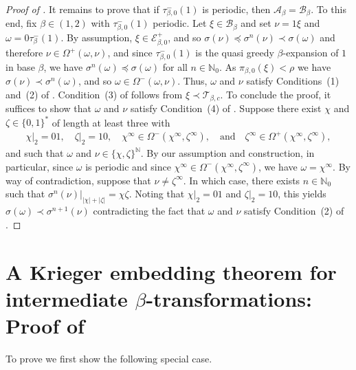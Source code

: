 \documentclass[a4paper,reqno,10pt]{amsart}
\begin{document}
\begin{proof}[Proof of \texorpdfstring{}{Theorem 1.1}]
It remains to prove that if $\tau_{\beta,0}^-(1)$ is periodic, then $\mathcal{A}_\beta = \mathcal{B}_\beta$. To this end, fix $\beta \in (1, 2)$ with $\tau_{\beta,0}^{-}(1)$ periodic. Let $\xi \in \mathcal{B}_\beta $ and set $\nu=1 \xi$ and $\omega = 0\tau_\beta^-(1)$. By assumption, $\xi \in \mathcal{E}_{\beta,0}^+$, and so $\sigma(\nu) \preceq \sigma^{n}(\nu) \prec \sigma(\omega)$ and therefore $\nu \in \Omega^{+}(\omega, \nu)$, and since $\tau_{\beta,0}^{-}(1)$ is the quasi greedy $\beta$-expansion of $1$ in base $\beta$, we have $\sigma^{n}(\omega) \preceq \sigma(\omega)$ for all $n \in \mathbb{N}_{0}$. As $\pi_{\beta,0}(\xi) < \rho$ we have $ \sigma(\nu) \prec \sigma^n(\omega)$, and so $\omega \in \Omega^{-}(\omega, \nu)$. Thus, $\omega$ and $\nu$ satisfy Conditions~(1) and~(2) of . Condition~(3) of  follows from $\xi \prec \mathcal{T}_{\beta,c}$. To conclude the proof, it suffices to show that $\omega$ and $\nu$ satisfy Condition~(4) of .  Suppose there exist $\chi$ and $\zeta \in \{0,1\}^{*}$ of length at least three with 
    \begin{align*}
        \chi\vert_{2} = 01, \quad
        \zeta\vert_{2} = 10, \quad
        \chi^{\infty} \in \Omega^{-}(\chi^{\infty},\zeta^{\infty}),
        \quad \text{and} \quad 
        \zeta^{\infty} \in \Omega^{+}(\chi^{\infty},\zeta^{\infty}),
    \end{align*}
and such that $\omega$ and $\nu \in \{ \chi, \zeta \}^{\mathbb{N}}$. By our assumption and construction, in particular, since $\omega$ is periodic and since $\chi^{\infty} \in \Omega^{-}(\chi^{\infty},\zeta^{\infty})$, we have $\omega = \chi^\infty$. By way of contradiction, suppose that $\nu \neq \zeta^\infty$.  In which case, there exists $n \in \mathbb{N}_{0}$ such that $\sigma^{n}(\nu)\vert_{\lvert \chi \rvert + \lvert \zeta \rvert} = \chi \zeta$. Noting that  $\chi\vert_{2} = 01$ and  $\zeta\vert_{2} = 10$, this yields $\sigma(\omega) \prec \sigma^{n+1}(\nu)$ contradicting the fact that $\omega$ and $\nu$ satisfy Condition~(2) of .
\end{proof}

%
%
%
\section{A Krieger embedding theorem for intermediate \texorpdfstring{$\beta$}{beta}-transformations: Proof of \texorpdfstring{}{Corollary 1.2}}\label{sec:proof_cor_1_2}
%
%
%

To prove  we first show the following special case.
\end{document}
